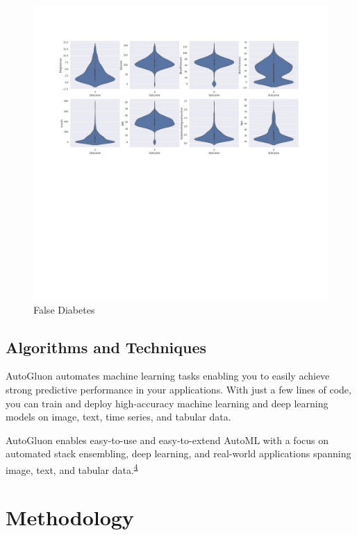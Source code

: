\documentclass[
]{article}
\begin{document}
\begin{figure}
\centering
\includegraphics{falsediab.jpg}
\caption{False Diabetes}
\end{figure}

\hypertarget{algorithms-and-techniques}{%
\subsection{Algorithms and Techniques}\label{algorithms-and-techniques}}

AutoGluon automates machine learning tasks enabling you to easily
achieve strong predictive performance in your applications. With just a
few lines of code, you can train and deploy high-accuracy machine
learning and deep learning models on image, text, time series, and
tabular data.

AutoGluon enables easy-to-use and easy-to-extend AutoML with a focus on
automated stack ensembling, deep learning, and real-world applications
spanning image, text, and tabular
data.\textsuperscript{\protect\hyperlink{ref-auto}{4}}

\hypertarget{methodology}{%
\section{Methodology}\label{methodology}}
\end{document}
